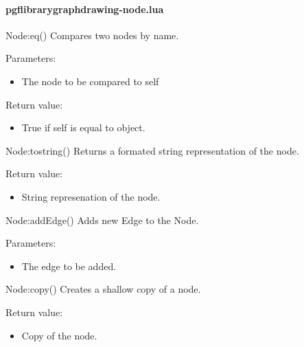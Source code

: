 
\paragraph{pgflibrarygraphdrawing-node.lua}


\begin{luacommand}{{Node:\textunderscore{}\textunderscore{}eq}()}
Compares two nodes by name.

Parameters:
\begin{itemize}
	\item[]  \subitem The node to be compared to self
\end{itemize}


Return value:
\begin{itemize} \item[] True if self is equal to object. \end{itemize}


\end{luacommand}\begin{luacommand}{{Node:\textunderscore{}\textunderscore{}tostring}()}
Returns a formated string representation of the node.


Return value:
\begin{itemize} \item[] String represenation of the node. \end{itemize}


\end{luacommand}\begin{luacommand}{{Node:addEdge}()}
Adds new Edge to the Node.

Parameters:
\begin{itemize}
	\item[]  \subitem The edge to be added.
\end{itemize}



\end{luacommand}\begin{luacommand}{{Node:copy}()}
Creates a shallow copy of a node.


Return value:
\begin{itemize} \item[] Copy of the node. \end{itemize}



\end{luacommand}
